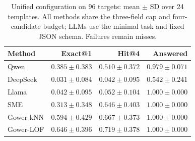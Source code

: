\begin{table}[t]
\centering\footnotesize
\caption{Unified configuration on 96 targets: mean $\pm$ SD over 24 templates. All methods share the three-field cap and four-candidate budget; LLMs use the minimal task and fixed JSON schema. Failures remain misses.}
\setlength{\tabcolsep}{3pt}
\renewcommand{\arraystretch}{1.12}
\begin{tabular}{lrrr}
\toprule
Method & Exact@1 & Hit@4 & Answered \\
\midrule
Qwen & $0.385\!\pm\!0.383$ & $0.510\!\pm\!0.372$ & $0.979\!\pm\!0.071$ \\
DeepSeek & $0.031\!\pm\!0.084$ & $0.042\!\pm\!0.095$ & $0.542\!\pm\!0.241$ \\
Llama & $0.042\!\pm\!0.095$ & $0.052\!\pm\!0.104$ & $1.000\!\pm\!0.000$ \\
SME & $0.313\!\pm\!0.348$ & $0.646\!\pm\!0.403$ & $1.000\!\pm\!0.000$ \\
Gower-kNN & $0.594\!\pm\!0.429$ & $0.667\!\pm\!0.373$ & $1.000\!\pm\!0.000$ \\
Gower-LOF & $0.646\!\pm\!0.396$ & $0.719\!\pm\!0.378$ & $1.000\!\pm\!0.000$ \\
\bottomrule
\end{tabular}
\renewcommand{\arraystretch}{1.0}
\label{tab:unified}
\end{table}
